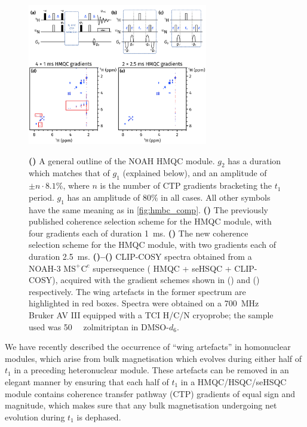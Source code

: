\documentclass[a4paper,11pt]{article}
\newcommand{\carbon}{\ch{^{13}C}}
\newcommand{\nitrogen}{\ch{^{15}N}}
\newcommand*{\zolmi}{Spectra were obtained on a \SI{700}{\MHz} Bruker AV III equipped with a TCI H/C/N cryoprobe; the sample used was \SI{50}{\milli\molar} zolmitriptan in DMSO-\(d_6\).}
\begin{document}
\begin{refsection}
\begin{figure}[ht]
    \centering
    \includegraphics[width=0.7\textwidth]{hmqc_comp.png}
    {\label{fig:hmqc_comp_pulprog}}
    {\label{fig:hmqc_comp_pulprog_before}}
    {\label{fig:hmqc_comp_pulprog_after}}
    {\label{fig:hmqc_comp_spec_before}}
    {\label{fig:hmqc_comp_spec_after}}
    \caption{
        \textbf{()} A general outline of the NOAH \nitrogen{} HMQC module.
        \(g_2\) has a duration which matches that of \(g_1\) (explained below), and an amplitude of \(\pm n \cdot 8.1\%\), where \(n\) is the number of CTP gradients bracketing the \(t_1\) period.
        \(g_1\) has an amplitude of \(80\%\) in all cases.
        All other symbols have the same meaning as in \cref{fig:hmbc_comp}.
        \textbf{()} The previously published coherence selection scheme for the HMQC module, with four gradients each of duration \SI{1}{ms}.
        \textbf{()} The new coherence selection scheme for the HMQC module, with two gradients each of duration \SI{2.5}{ms}.
        \textbf{()--()} CLIP-COSY spectra obtained from a NOAH-3 \(\mathrm{MS^+C^c}\) supersequence (\nitrogen{} HMQC + \carbon{} seHSQC + CLIP-COSY), acquired with the gradient schemes shown in () and () respectively.
        The wing artefacts in the former spectrum are highlighted in red boxes.
        \zolmi{}
    }
    \label{fig:hmqc_comp}
\end{figure}

We have recently described the occurrence of ``wing artefacts'' in homonuclear modules, which arise from bulk magnetisation which evolves during either half of \(t_1\) in a preceding heteronuclear module.\autocite{Yong2021JMR}
These artefacts can be removed in an elegant manner by ensuring that each half of \(t_1\) in a HMQC/HSQC/seHSQC module contains coherence transfer pathway (CTP) gradients of equal sign and magnitude, which makes sure that any bulk magnetisation undergoing net evolution during \(t_1\) is dephased.


\end{refsection}
\end{document}
